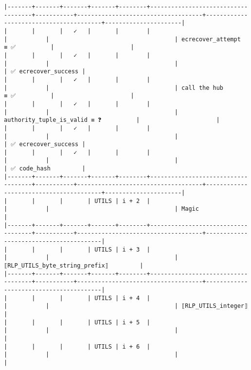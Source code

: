 \documentclass[varwidth=\maxdimen,margin=0.5cm,multi={verbatim}]{standalone}
\begin{document}
\begin{verbatim}
|-------+-------+-------+-------+--------+------------------------------------+-----------+------------------------------------+----------------------------------------+----------------------|
|       |       |   ✓   |       |        |                                    |           |                                    | ecrecover_attempt        ≡ ✅          |                      |
|       |       |   ✓   |       |        |                                    |           |                                    |                                        | ✅ ecrecover_success |
|       |       |   ✓   |       |        |                                    |           |                                    | call the hub             ≡ ✅          |                      |
|       |       |   ✓   |       |        |                                    |           |                                    | authority_tuple_is_valid ≡ ❓          |                      |
|       |       |   ✓   |       |        |                                    |           |                                    |                                        | ✅ ecrecover_success |
|       |       |   ✓   |       |        |                                    |           |                                    |                                        | ✅ code_hash         |
|-------+-------+-------+-------+--------+------------------------------------+-----------+------------------------------------+----------------------------------------+----------------------|
|       |       |       | UTILS | i + 2  |                                    |           |                                    | Magic                                  |
|-------+-------+-------+-------+--------+------------------------------------+-----------+------------------------------------+----------------------------------------|
|       |       |       | UTILS | i + 3  |                                    |           |                                    | ⟦RLP_UTILS_byte_string_prefix⟧         |
|-------+-------+-------+-------+--------+------------------------------------+-----------+------------------------------------+----------------------------------------|
|       |       |       | UTILS | i + 4  |                                    |           |                                    | ⟦RLP_UTILS_integer⟧                    |
|       |       |       | UTILS | i + 5  |                                    |           |                                    |                                        |
|       |       |       | UTILS | i + 6  |                                    |           |                                    |                                        |

\end{verbatim}
\end{document}
